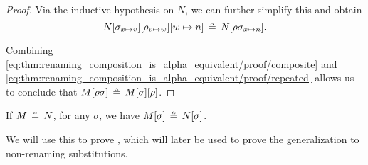 \begin{proof}
  Via the inductive hypothesis on \( N \), we can further simplify this and obtain
  \begin{equation}\label{eq:thm:renaming_composition_is_alpha_equivalent/proof/repeated}
    N[\sigma_{x \mapsto v}][\rho_{v \mapsto w}][w \mapsto n] \aequiv N[\rho\sigma_{x \mapsto n}].
  \end{equation}

  Combining \eqref{eq:thm:renaming_composition_is_alpha_equivalent/proof/composite} and \eqref{eq:thm:renaming_composition_is_alpha_equivalent/proof/repeated} allows us to conclude that \( M[\rho\sigma] \aequiv M[\sigma][\rho] \).
\end{proof}

\begin{lemma}\label{thm:renaming_on_alpha_equivalent_terms}
  If \( M \aequiv N \), for any \hyperref[def:lambda_renaming]{} \( \sigma \), we have \( M[\sigma] \aequiv N[\sigma] \).
\end{lemma}
\begin{comments}
  \item We will use this to prove , which will later be used to prove the generalization  to non-renaming substitutions.
\end{comments}

